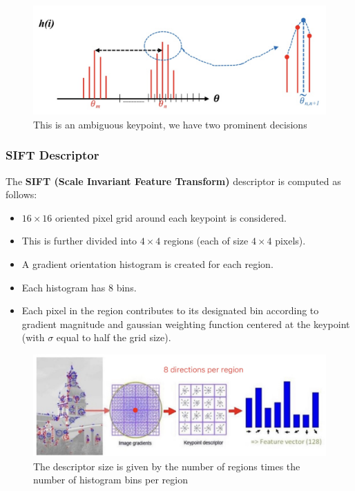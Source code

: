\documentclass{article}
\begin{document}
\begin{figure}[htbp]
  \centering
  \includegraphics[width=0.7\linewidth]{./img/ambiguous_keypoint.jpg}
  \caption{This is an ambiguous keypoint, we have two prominent decisions}
  \label{fig:ambiguous_keypoints}
\end{figure}

\subsubsection{SIFT Descriptor}

The \textbf{SIFT (Scale Invariant Feature Transform)} descriptor is computed as follows:
\begin{itemize}
  \item $16\times 16$ oriented pixel grid around each keypoint is considered.
  \item This is further divided into $4 \times 4$ regions (each of size $4\times4$ pixels).
  \item A gradient orientation histogram is created for each region.
  \item Each histogram has 8 bins.
  \item Each pixel in the region contributes to its designated bin according to gradient magnitude and gaussian weighting function centered at the keypoint (with $\sigma$ equal to half the grid size).
\end{itemize}

\begin{figure}[htbp]
  \centering
  \includegraphics[width=0.8\linewidth]{./img/sift_descriptor.jpg}
  \caption{The descriptor size is given by the number of regions times the number of histogram bins per region}
  \label{fig:sift_descriptor}
\end{figure}
\end{document}

